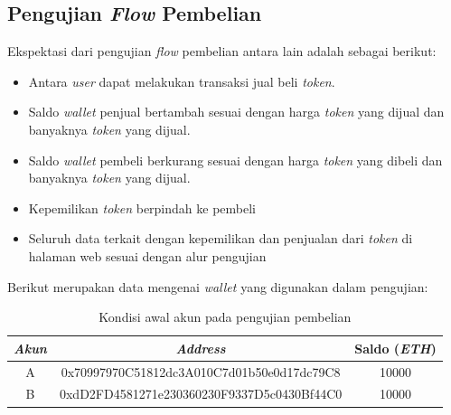 \subsection{Pengujian \emph{Flow} Pembelian}

Ekspektasi dari pengujian \emph{flow} pembelian antara lain adalah sebagai berikut:
\begin{itemize}
    \item Antara \emph{user} dapat melakukan transaksi jual beli \emph{token}.
    \item Saldo \emph{wallet} penjual bertambah sesuai dengan harga \emph{token} yang dijual dan banyaknya \emph{token} yang dijual.
    \item Saldo \emph{wallet} pembeli berkurang sesuai dengan harga \emph{token} yang dibeli dan banyaknya \emph{token} yang dijual.
    \item Kepemilikan \emph{token} berpindah ke pembeli
    \item Seluruh data terkait dengan kepemilikan dan penjualan dari \emph{token} di halaman web sesuai dengan alur pengujian  
\end{itemize}

Berikut merupakan data mengenai \emph{wallet} yang digunakan dalam pengujian:

\begin{longtable}{|c|c|c|}
    \caption{Kondisi awal akun pada pengujian pembelian}
    \label{tb:KondisiAwalPengujianPembelian}                                   \\
    \hline
    \rowcolor[HTML]{C0C0C0}
    \textbf{\emph{Akun}} & \textbf{\emph{Address}} & \textbf{Saldo (\emph{ETH})}\\
    \hline
    A & 0x70997970C51812dc3A010C7d01b50e0d17dc79C8            & 10000               \\
    B & 0xdD2FD4581271e230360230F9337D5c0430Bf44C0            & 10000               \\
    \hline
  \end{longtable}

